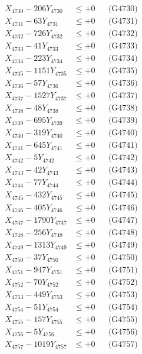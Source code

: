 \documentclass[a4paper,10pt]{article}
\begin{document}
{\begin{align}
X_{4730} - 206Y_{4730} &\leq +0 && \text{(G4730)} \\
\allowbreak
X_{4731} - 63Y_{4731} &\leq +0 && \text{(G4731)} \\
X_{4732} - 726Y_{4732} &\leq +0 && \text{(G4732)} \\
X_{4733} - 41Y_{4733} &\leq +0 && \text{(G4733)} \\
X_{4734} - 223Y_{4734} &\leq +0 && \text{(G4734)} \\
X_{4735} - 1151Y_{4735} &\leq +0 && \text{(G4735)} \\
X_{4736} - 57Y_{4736} &\leq +0 && \text{(G4736)} \\
X_{4737} - 1527Y_{4737} &\leq +0 && \text{(G4737)} \\
X_{4738} - 48Y_{4738} &\leq +0 && \text{(G4738)} \\
X_{4739} - 695Y_{4739} &\leq +0 && \text{(G4739)} \\
X_{4740} - 319Y_{4740} &\leq +0 && \text{(G4740)} \\
\allowbreak
X_{4741} - 645Y_{4741} &\leq +0 && \text{(G4741)} \\
X_{4742} - 5Y_{4742} &\leq +0 && \text{(G4742)} \\
X_{4743} - 42Y_{4743} &\leq +0 && \text{(G4743)} \\
X_{4744} - 77Y_{4744} &\leq +0 && \text{(G4744)} \\
X_{4745} - 432Y_{4745} &\leq +0 && \text{(G4745)} \\
X_{4746} - 405Y_{4746} &\leq +0 && \text{(G4746)} \\
X_{4747} - 1790Y_{4747} &\leq +0 && \text{(G4747)} \\
X_{4748} - 256Y_{4748} &\leq +0 && \text{(G4748)} \\
X_{4749} - 1313Y_{4749} &\leq +0 && \text{(G4749)} \\
X_{4750} - 37Y_{4750} &\leq +0 && \text{(G4750)} \\
\allowbreak
X_{4751} - 947Y_{4751} &\leq +0 && \text{(G4751)} \\
X_{4752} - 70Y_{4752} &\leq +0 && \text{(G4752)} \\
X_{4753} - 449Y_{4753} &\leq +0 && \text{(G4753)} \\
X_{4754} - 51Y_{4754} &\leq +0 && \text{(G4754)} \\
X_{4755} - 157Y_{4755} &\leq +0 && \text{(G4755)} \\
X_{4756} - 5Y_{4756} &\leq +0 && \text{(G4756)} \\
X_{4757} - 1019Y_{4757} &\leq +0 && \text{(G4757)} \\

\end{align}}
\end{document}

